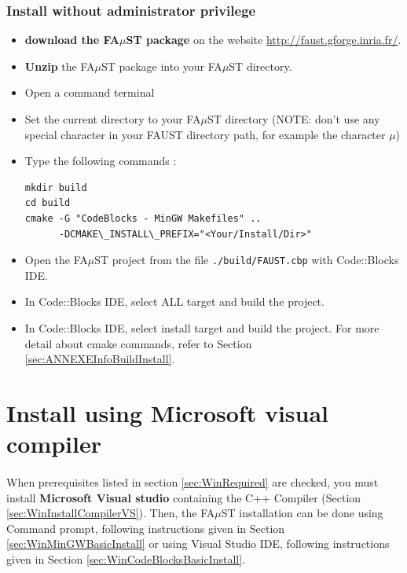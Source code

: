 \subsubsection{Install without administrator privilege}
\label{sec:WinMinGWCodeBlocksNoAdminBasicInstall}
\begin{itemize}
\item \textbf{download the FA$\mu$ST package} on the website  \url{http://faust.gforge.inria.fr/}. 
\item \textbf{Unzip} the FA$\mu$ST package into your FA$\mu$ST directory. 

\item Open a command terminal
\item Set the current directory to your FA$\mu$ST directory (NOTE: don't use any special character in your FAUST directory path, for example the character $\mu$)
\item Type the following commands : 
\begin{lstlisting}
mkdir build
cd build
cmake -G "CodeBlocks - MinGW Makefiles" .. 
	  -DCMAKE\_INSTALL\_PREFIX="<Your/Install/Dir>"
\end{lstlisting}
\item Open the FA$\mu$ST project from the file \texttt{./build/FAUST.cbp} with Code::Blocks IDE.
\item In Code::Blocks IDE, select ALL target and build the project.
\item In Code::Blocks IDE, select install target and build the project.
For more detail about cmake commands, refer to Section \ref{sec:ANNEXEInfoBuildInstall}.
\end{itemize}





\section{Install using Microsoft visual compiler}\label{sec:WinInstallVS}

\paragraph{}When prerequisites listed in section \ref{sec:WinRequired} are checked, you must install \textbf{Microsoft Visual studio} containing the C++ Compiler (Section \ref{sec:WinInstallCompilerVS}).
Then, the FA$\mu$ST installation can be done using Command prompt, following instructions given in Section \ref{sec:WinMinGWBasicInstall} or using Visual Studio IDE, following instructions given in Section \ref{sec:WinCodeBlocksBasicInstall}. 



